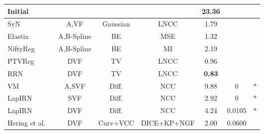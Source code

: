 \begin{table*}[b]
\begin{small}
\begin{tabular}{lcccccc}
			Initial                                               &                         &                                       &             & 23.36\resTS                &                                                      \\ \midrule
			SyN~\cite{avants2008symmetric}                        & A,VF                    & Gaussian                              & LNCC        & 1.79\resTS                 & \textemdash       & \cite{hansen2021graphregnet}     \\
			Elastix~\cite{klein2009elastix}                       & A,B-Spline              & BE                                    & MSE         & 1.32\resTS                 & \textemdash       & \cite{hansen2021graphregnet}     \\
			NiftyReg~\cite{modat2010fast}                         & A,B-Spline              & BE                                    & MI          & 2.19\resTS                 & \textemdash       & \cite{hansen2021graphregnet}     \\
			PTVReg~\cite{vishnevskiy2017isotropic}                & DVF                     & TV                                    & LNCC        & 0.96\resTS                 & \textemdash       & ~\cite{vishnevskiy2017isotropic} \\
			RRN~\cite{he2021recursive}                            & DVF                     & TV                                    & LNCC        & \textbf{0.83}\resTS        & \textemdash       & ~\cite{he2021recursive}          \\
			\midrule
			VM~\cite{balakrishnan2019voxelmorph}                  & A,SVF                   & Diff.                                 & NCC         & 9.88\resTS                 & 0                 & $\ast$                           \\
			LapIRN~\cite{mok2020large}                            & SVF                     & Diff.                                 & NCC         & 2.92\resTS                 & 0                 & $\ast$                           \\
			LapIRN~\cite{mok2020large}                            & DVF                     & Diff.                                 & NCC         & 4.24\resTS                 & 0.0105            & $\ast$                           \\
			Hering et al. ~\cite{hering2021cnn}                   & DVF                     & Curv+VCC                              & DICE+KP+NGF & 2.00\resTS                 & 0.0600            & ~\cite{hering2021cnn}            \\

\end{tabular}
\end{small}
\end{table*}
